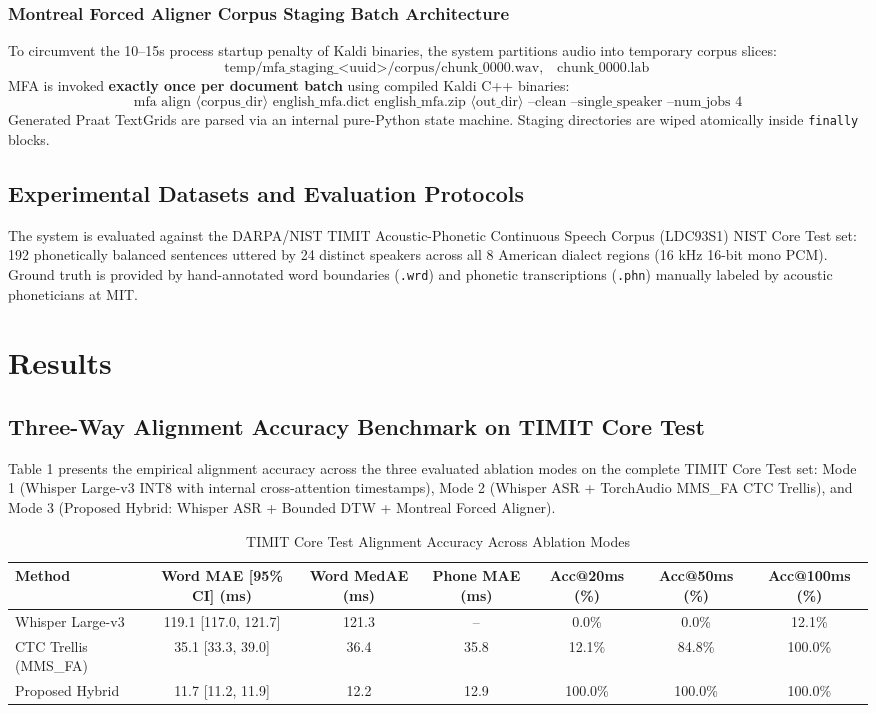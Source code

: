 \documentclass[12pt,a4paper]{article}
\begin{document}
\subsubsection{Montreal Forced Aligner Corpus Staging Batch Architecture}
To circumvent the 10--15s process startup penalty of Kaldi binaries, the system partitions audio into temporary corpus slices:
$$\text{temp/mfa\_staging\_<uuid>/corpus/chunk\_0000.wav}, \quad \text{chunk\_0000.lab}$$
MFA is invoked \textbf{exactly once per document batch} using compiled Kaldi C++ binaries:
$$\text{mfa align } \langle \text{corpus\_dir} \rangle \text{ english\_mfa.dict english\_mfa.zip } \langle \text{out\_dir} \rangle \text{ --clean --single\_speaker --num\_jobs 4}$$
Generated Praat TextGrids are parsed via an internal pure-Python state machine. Staging directories are wiped atomically inside \texttt{finally} blocks.

\subsection{Experimental Datasets and Evaluation Protocols}
The system is evaluated against the DARPA/NIST TIMIT Acoustic-Phonetic Continuous Speech Corpus (LDC93S1) NIST Core Test set: 192 phonetically balanced sentences uttered by 24 distinct speakers across all 8 American dialect regions (16 kHz 16-bit mono PCM). Ground truth is provided by hand-annotated word boundaries (\texttt{.wrd}) and phonetic transcriptions (\texttt{.phn}) manually labeled by acoustic phoneticians at MIT.

\section{Results}

\subsection{Three-Way Alignment Accuracy Benchmark on TIMIT Core Test}
Table 1 presents the empirical alignment accuracy across the three evaluated ablation modes on the complete TIMIT Core Test set: Mode 1 (Whisper Large-v3 INT8 with internal cross-attention timestamps), Mode 2 (Whisper ASR + TorchAudio MMS\_FA CTC Trellis), and Mode 3 (Proposed Hybrid: Whisper ASR + Bounded DTW + Montreal Forced Aligner).

\begin{table}[t]
\centering
\caption{TIMIT Core Test Alignment Accuracy Across Ablation Modes}
\label{tab:alignment_accuracy}
\begin{tabular}{lcccccc}
\toprule
Method & Word MAE [95\% CI] (ms) & Word MedAE (ms) & Phone MAE (ms) & Acc@20ms (\%) & Acc@50ms (\%) & Acc@100ms (\%) \\
\midrule
Whisper Large-v3 & 119.1 [117.0, 121.7] & 121.3 & -- & 0.0\% & 0.0\% & 12.1\% \\
CTC Trellis (MMS\_FA) & 35.1 [33.3, 39.0] & 36.4 & 35.8 & 12.1\% & 84.8\% & 100.0\% \\
Proposed Hybrid & 11.7 [11.2, 11.9] & 12.2 & 12.9 & 100.0\% & 100.0\% & 100.0\% \\
\bottomrule
\end{tabular}
\end{table}
\end{document}
